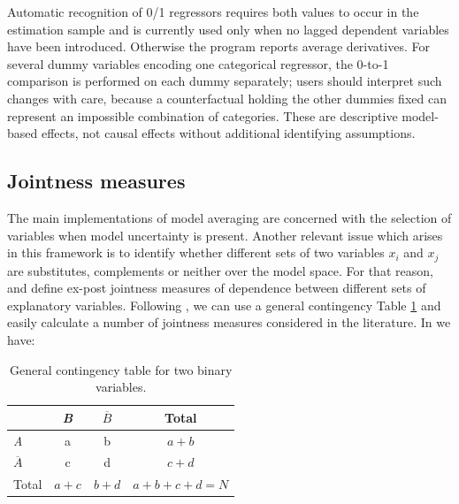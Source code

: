 Automatic recognition of 0/1 regressors requires both values to occur in
the estimation sample and is currently used only when no lagged dependent
variables have been introduced. Otherwise the program reports average
derivatives. For several dummy variables encoding one categorical regressor,
the 0-to-1 comparison is performed on each dummy separately; users should
interpret such changes with care, because a counterfactual holding the other
dummies fixed can represent an impossible combination of categories.
These are descriptive model-based effects, not causal effects without
additional identifying assumptions.

\subsection{Jointness measures}\label{sec:jointness_measures}
The main implementations of  model averaging are concerned
with the selection of variables when model uncertainty is
present. Another relevant issue which arises in this framework is to
identify whether different sets of two variables $x_i$ and $x_j$ are
substitutes, complements or neither over the model space. For that
reason, \cite{LeySteel2007} and \cite{DoppelhoferWeeks2009} define
ex-post jointness measures of dependence between different sets of
explanatory variables. Following \cite{Hofmarcher2018},
we can  use a general contingency Table \ref{tab:GeneralContingencyTable}
and easily calculate a number of jointness measures considered
in the literature. In  we have:

\begin{table}[h!tb]
	\centering
	\caption{General contingency table for two binary variables.}
	\begin{tabular}{l|ccc}\hline
		&\textit{B}	&	$\overline{B}$	&Total	\\\hline
		\textit{A}		&	a		&	b			& $a+b$		\\
		$\overline{A}$	&	c		&	d			& $c+d$		\\
		Total			&	$a+c$	&	$b+d$		& $a+b+c+d=N$\\\hline
	\end{tabular}
	\label{tab:GeneralContingencyTable}
\end{table}

